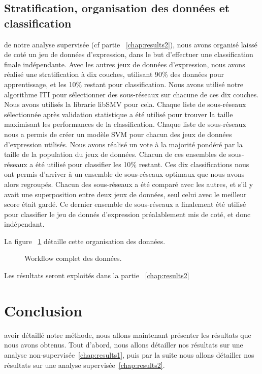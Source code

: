		\subsection{\textcolor{mygreen}{Stratification, organisation des données et classification}}
			 de notre analyse supervisée (cf partie ~\ref{chap:results2}), nous avons organisé laissé de coté un jeu de données d'expression, dans le but d'effectuer une classification finale indépendante.
			Avec les autres jeux de données d'expression, nous avons réalisé une stratification à dix couches, utilisant 90\% des données pour apprentissage, et les 10\% restant pour classification.
			Nous avons utilisé notre algorithme ITI pour sélectionner des sous-réseaux sur chacune de ces dix couches.
			Nous avons utilisés la librarie libSMV pour cela.
			Chaque liste de sous-réseaux sélectionnée après validation statistique a été utilisé pour trouver la taille maximisant les performances de la classification.
			Chaque liste de sous-réseaux nous a permis de créer un modèle SVM pour chacun des jeux de données d'expression utilisés.
			Nous avons réalisé un vote à la majorité pondéré par la taille de la population du jeux de données.
			Chacun de ces ensembles de sous-réseaux a été utilisé pour classifier les 10\% restant.
			Ces dix classifications nous ont permis d'arriver à un ensemble de sous-réseaux optimaux que nous avons alors regroupés.
			Chacun des sous-réseaux a été comparé avec les autres, et s'il y avait une superposition entre deux jeux de données, seul celui avec le meilleur score était gardé.
			Ce dernier ensemble de sous-réseaux a finalement été utilisé pour classifier le jeu de donnés d'expression préalablement mis de coté, et donc indépendant.

			La figure ~\ref{fig:Workflow} détaille cette organisation des données.

			\begin{figure}
				\begin{center}
					\def\svgwidth{\columnwidth}
					\caption{Workflow complet des données.}
					\label{fig:Workflow}
				\end{center}
			\end{figure}

			Les résultats seront exploités dans la partie ~\ref{chap:results2}

	\section{\textcolor{mygreen}{Conclusion}}
		 avoir détaillé notre méthode, nous allons maintenant présenter les résultats que nous avons obtenus. Tout d'abord, nous allons détailler nos résultats sur une analyse non-supervisée~\ref{chap:results1}, puis par la suite nous allons détailler nos résultats sur une analyse supervisée~\ref{chap:results2}.